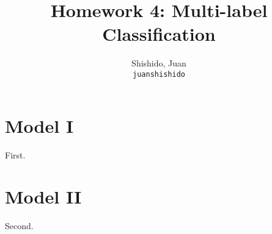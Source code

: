 \documentclass[11pt]{article}
\title{Homework 4: Multi-label Classification}
\author{
  Shishido, Juan\\
  \texttt{juanshishido}
}
\begin{document}
\maketitle

\section{Model I}

First.

\section{Model II}

Second.
\end{document}
